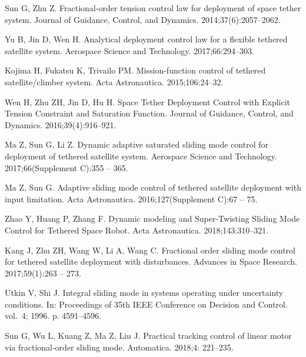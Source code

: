 \documentclass[ShortAfour]{sage}
\theoremstyle{plain}
\theoremstyle{remark}
\begin{document}
\begin{thebibliography}{10}
  Sun G, Zhu Z.
  \newblock Fractional-order tension control law for deployment of space tether
    system.
  \newblock Journal of Guidance, Control, and Dynamics. 2014;37(6):2057--2062.
  
  Yu B, Jin D, Wen H.
  \newblock Analytical deployment control law for a flexible tethered satellite
    system.
  \newblock Aerospace Science and Technology. 2017;66:294--303.
  
  Kojima H, Fukatsu K, Trivailo PM.
  \newblock Mission-function control of tethered satellite/climber system.
  \newblock Acta Astronautica. 2015;106:24--32.
  
  Wen H, Zhu ZH, Jin D, Hu H.
  \newblock Space Tether Deployment Control with Explicit Tension Constraint and
    Saturation Function.
  \newblock Journal of Guidance, Control, and Dynamics. 2016;39(4):916--921.
  
  Ma Z, Sun G, Li Z.
  \newblock Dynamic adaptive saturated sliding mode control for deployment of
    tethered satellite system.
  \newblock Aerospace Science and Technology. 2017;66(Supplement C):355 -- 365.
  
  Ma Z, Sun G.
  \newblock Adaptive sliding mode control of tethered satellite deployment with
    input limitation.
  \newblock Acta Astronautica. 2016;127(Supplement C):67 -- 75.
  
  Zhao Y, Huang P, Zhang F.
  \newblock Dynamic modeling and Super-Twisting Sliding Mode Control for Tethered
    Space Robot.
  \newblock Acta Astronautica. 2018;143:310--321.
  
  Kang J, Zhu ZH, Wang W, Li A, Wang C.
  \newblock Fractional order sliding mode control for tethered satellite
    deployment with disturbances.
  \newblock Advances in Space Research. 2017;59(1):263 -- 273.
  
  Utkin V, Shi J.
  \newblock Integral sliding mode in systems operating under uncertainty
    conditions.
  \newblock In: Proceedings of 35th IEEE Conference on Decision and Control.
    vol.~4; 1996. p. 4591--4596.

    Sun G, Wu L, Kuang Z, Ma Z, Liu J.
    \newblock Practical tracking control of linear motor via fractional-order sliding mode.
    \newblock Automatica.
      2018;4: 221--235.


\end{thebibliography}
\end{document}
